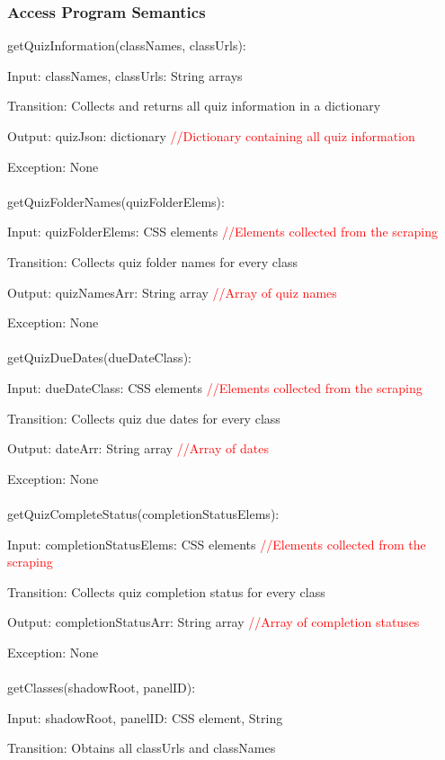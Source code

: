 \documentclass[12pt, titlepage]{article}
\begin{document}
\subsubsection{Access Program Semantics}
getQuizInformation(classNames, classUrls):

    Input: classNames, classUrls: String arrays

    Transition: Collects and returns all quiz information in a dictionary

    Output: quizJson: dictionary \textcolor{red}{//Dictionary containing all quiz information}

    Exception: None
\\
\\
getQuizFolderNames(quizFolderElems):
    
    Input: quizFolderElems: CSS elements \textcolor{red}{//Elements collected from the scraping}
    
    Transition: Collects quiz folder names for every class
    
    Output: quizNamesArr: String array \textcolor{red}{//Array of quiz names}
    
    Exception: None
\\
\\
getQuizDueDates(dueDateClass):
    
    Input: dueDateClass: CSS elements \textcolor{red}{//Elements collected from the scraping}
    
    Transition: Collects quiz due dates for every class
    
    Output: dateArr: String array \textcolor{red}{//Array of dates}
    
    Exception: None
\\
\\
getQuizCompleteStatus(completionStatusElems):
    
    Input: completionStatusElems: CSS elements \textcolor{red}{//Elements collected from the scraping}
    
    Transition: Collects quiz completion status for every class
    
    Output: completionStatusArr: String array \textcolor{red}{//Array of completion statuses}
    
    Exception: None
\\
\\
getClasses(shadowRoot, panelID):
    
    Input: shadowRoot, panelID: CSS element, String
    
    Transition: Obtains all classUrls and classNames
    
\end{document}
